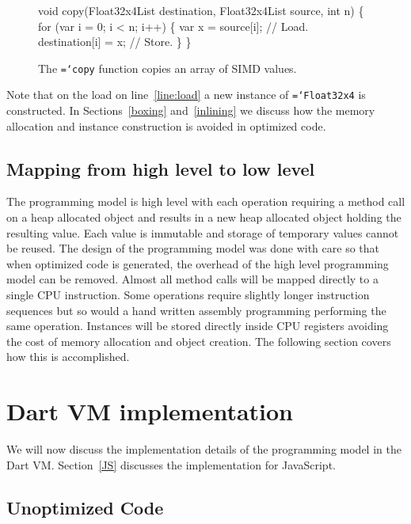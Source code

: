 \documentclass{sigplanconf}
\newcommand{\ttt}[1]{{\texttt{\hyphenchar\font=`\-\relax #1}}}%
\begin{document}
\begin{figure}
\begin{small}
\begin{program}[style=tt, number=true]
vo\tab{}id copy(\tab{}Float32x4List destination,
          Float32x4List source,
          int n) \{\untab{}
  fo\tab{}r (var i = 0; i < n; i++) \{
    var x = source[i];   // Load.\label{line:load}
    destination[i] = x;  // Store.\untab{}
  \}\untab{}
\}
\end{program}
\end{small}
\caption{The \ttt{copy} function copies an array of SIMD values.}
\label{fig:load-store}
\end{figure}

Note that on the load on line~\ref{line:load} a new instance of \ttt{Float32x4}
is constructed. In Sections~\ref{boxing} and~\ref{inlining} we discuss how the
memory allocation and instance construction is avoided in optimized code.

\subsection{Mapping from high level to low level}

The programming model is high level with each operation requiring a method call
on a heap allocated object and results in a new heap allocated object holding
the resulting value. Each value is immutable and storage of temporary values
cannot be reused. The design of the programming model was done with care so that
when optimized code is generated, the overhead of the high level programming
model can be removed. Almost all method calls will be mapped directly to a
single CPU instruction. Some operations require slightly longer instruction
sequences but so would a hand written assembly programming performing the same
operation. Instances will be stored directly inside CPU registers avoiding the
cost of memory allocation and object creation. The following section covers how
this is accomplished.

\section{Dart VM implementation}

We will now discuss the implementation details of the programming model in the
Dart VM. Section~\ref{JS} discusses the implementation for JavaScript.

\subsection{Unoptimized Code}
\end{document}
